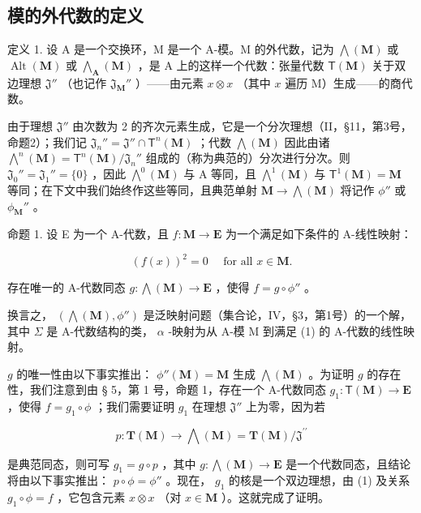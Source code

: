 \subsection{模的外代数的定义}

定义 1. 设 A 是一个交换环，M 是一个 A-模。M 的外代数，记为 \(\bigwedge (\mathbf{M})\) 或 \(\operatorname {Alt}(\mathbf{M})\) 或 \(\bigwedge_{\mathbf{A}}(\mathbf{M})\) ，是 A 上的这样一个代数：张量代数 \(\mathsf{T}(\mathbf{M})\) 关于双边理想 \(\mathfrak{J}''\) （也记作 \(\mathfrak{J}_{\mathbf{M}}''\) ）——由元素 \(x\otimes x\) （其中 \(x\) 遍历 M）生成——的商代数。

由于理想 \(\mathfrak{J}''\) 由次数为 2 的齐次元素生成，它是一个分次理想（II，§11，第3号，命题2）；我们记 \(\mathfrak{J}_n'' = \mathfrak{J}'' \cap \mathsf{T}^n(\mathbf{M})\) ；代数 \(\bigwedge(\mathbf{M})\) 因此由诸 \(\bigwedge^n(\mathbf{M}) = \mathsf{T}^n(\mathbf{M}) / \mathfrak{J}_n''\) 组成的（称为典范的）分次进行分次。则 \(\mathfrak{J}_0'' = \mathfrak{J}_1'' = \{0\}\) ，因此 \(\bigwedge^0(\mathbf{M})\) 与 A 等同，且 \(\bigwedge^1(\mathbf{M})\) 与 \(\mathsf{T}^1(\mathbf{M}) = \mathbf{M}\) 等同；在下文中我们始终作这些等同，且典范单射 \(\mathbf{M} \to \bigwedge(\mathbf{M})\) 将记作 \(\phi''\) 或 \(\phi_{\mathbf{M}}''\) 。

命题 1. 设 E 为一个 A-代数，且 \(f: \mathbf{M} \to \mathbf{E}\) 为一个满足如下条件的 A-线性映射：

\[
(f (x)) ^ {2} = 0 \quad \text { for all } x \in \mathbf {M}.\tag{1}
\]

存在唯一的 A-代数同态 \(g: \bigwedge(\mathbf{M}) \to \mathbf{E}\) ，使得 \(f = g \circ \phi''\) 。

换言之， \((\bigwedge (\mathbf{M}),\phi '')\) 是泛映射问题（集合论，IV，§3，第1号）的一个解，其中 \(\Sigma\) 是 A-代数结构的类， \(\alpha\) -映射为从 A-模 M 到满足 (1) 的 A-代数的线性映射。

\(g\) 的唯一性由以下事实推出： \(\phi''(\mathbf{M}) = \mathbf{M}\) 生成 \(\bigwedge (\mathbf{M})\) 。为证明 \(g\) 的存在性，我们注意到由 § 5，第 1 号，命题 1，存在一个 A-代数同态 \(g_1: \mathsf{T}(\mathbf{M}) \to \mathbf{E}\) ，使得 \(f = g_1 \circ \phi\) ；我们需要证明 \(g_1\) 在理想 \(\mathfrak{J}''\) 上为零，因为若

\[
p \colon \mathbf {T} (\mathbf {M}) \rightarrow \bigwedge (\mathbf {M}) = \mathbf {T} (\mathbf {M}) / \mathfrak {J} ^ {\prime \prime}
\]

是典范同态，则可写 \(g_1 = g \circ p\) ，其中 \(g: \bigwedge (\mathbf{M}) \to \mathbf{E}\) 是一个代数同态，且结论将由以下事实推出： \(p \circ \phi = \phi''\) 。现在， \(g_1\) 的核是一个双边理想，由 (1) 及关系 \(g_1 \circ \phi = f\) ，它包含元素 \(x \otimes x\) （对 \(x \in \mathbf{M}\) ）。这就完成了证明。

